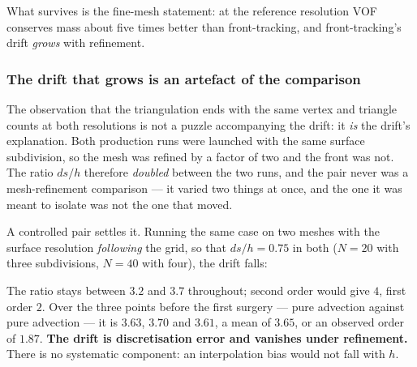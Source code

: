 What survives is the fine-mesh statement: at the reference resolution VOF
conserves mass about five times better than front-tracking, and front-tracking's
drift \emph{grows} with refinement.

\subsubsection{The drift that grows is an artefact of the comparison}
\label{sec:deriva-nsub}

The observation that the triangulation ends with the same vertex and triangle
counts at both resolutions is not a puzzle accompanying the drift: it
\emph{is} the drift's explanation. Both production runs were launched with the
same surface subdivision, so the mesh was refined by a factor of two and the
front was not. The ratio $ds/h$ therefore \emph{doubled} between the two runs,
and the pair never was a mesh-refinement comparison --- it varied two things at
once, and the one it was meant to isolate was not the one that moved.

A controlled pair settles it. Running the same case on two meshes with the
surface resolution \emph{following} the grid, so that $ds/h = 0.75$ in both
($N=20$ with three subdivisions, $N=40$ with four), the drift falls:


The ratio stays between $3.2$ and $3.7$ throughout; second order would give
$4$, first order $2$. Over the three points before the first surgery --- pure
advection against pure advection --- it is $3.63$, $3.70$ and $3.61$, a mean of
$3.65$, or an observed order of $\mathbf{1.87}$. \textbf{The drift is
discretisation error and vanishes under refinement.} There is no systematic
component: an interpolation bias would not fall with $h$.


